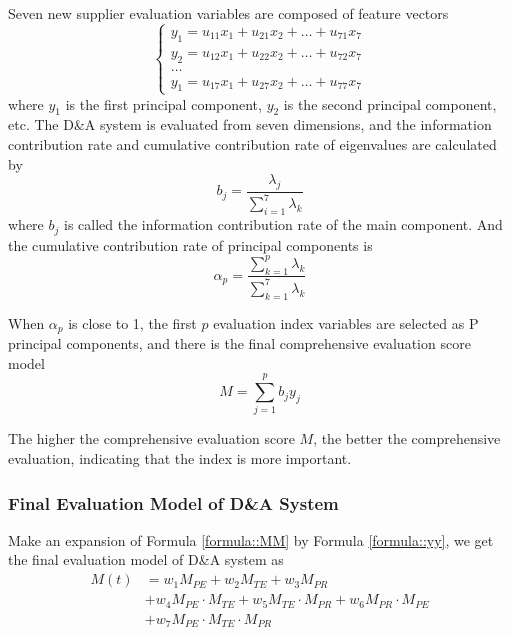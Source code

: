\documentclass{mcmthesis}
\begin{document}
Seven new supplier evaluation variables are composed of feature vectors
\begin{equation}
    \begin{cases}
    y_1 = u_{11}x_1+u_{21}x_2+\dots +u_{71}x_7 \\
    y_2 = u_{12}x_1+u_{22}x_2+\dots +u_{72}x_7 \\
    \dots \\
    y_1 = u_{17}x_1+u_{27}x_2+\dots +u_{77}x_7 
    \end{cases}
    \label{formula::yy}
\end{equation}
where $y_1$ is the first principal component, $y_2$ is the second principal component, etc. The D\&A system is evaluated from seven dimensions, and the information contribution rate and cumulative contribution rate of eigenvalues are calculated by
\begin{equation}
    b_j=\frac{\lambda_j}{\sum_{i=1}^7 \lambda_k}
\end{equation}
where $b_j$ is called the information contribution rate of the main component. And the cumulative contribution rate of principal components is
\begin{equation}
    \alpha_p = \frac{\sum_{k=1}^p \lambda_k}{\sum_{k=1}^7 \lambda_k}
\end{equation}

When $\alpha_p$ is close to 1, the first $p$ evaluation index variables are selected as P principal components, and there is the final comprehensive evaluation score model
\begin{equation}
    M = \sum_{j=1}^p b_jy_j
    \label{formula::MM}
\end{equation}

The higher the comprehensive evaluation score $M$, the better the comprehensive evaluation, indicating that the index is more important.

\subsubsection{Final Evaluation Model of D\&A System}

Make an expansion of Formula \ref{formula::MM} by Formula \ref{formula::yy}, we get the final evaluation model of D\&A system as
\begin{equation}
    \begin{split}
    M(t) &= w_1M_{PE}+w_2M_{TE}+w_3M_{PR} \\
    &+w_4M_{PE} \cdot M_{TE} +w_5M_{TE} \cdot M_{PR} +w_6M_{PR} \cdot M_{PE} \\
    &+w_7M_{PE} \cdot M_{TE} \cdot M_{PR}   
    \end{split}
    \label{formula::Mt}
\end{equation}
\end{document}
